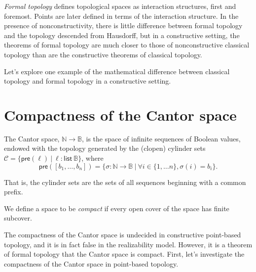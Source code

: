\documentclass{article}           %
\newcommand{\suchthat}{\ |\ }
\newcommand{\nat}{\mathbb{N}}
\newcommand{\bool}{\mathbb{B}}
\newcommand{\List}[1]{\mathsf{list}\ {#1}}
\begin{document}
\emph{Formal topology} defines topological spaces as interaction structures, first and foremost. Points are later defined in terms of the interaction structure. In the presence of nonconstructivity, there is little difference between formal topology and the topology descended from Hausdorff, but in a constructive setting, the theorems of formal topology are much closer to those of nonconstructive classical topology than are the constructive theorems of classical topology.

Let's explore one example of the mathematical difference between classical topology and formal topology in a constructive setting.

\section{Compactness of the Cantor space}

The Cantor space, $\nat \to \bool$, is the space of infinite sequences of Boolean values, endowed with the topology generated by the (clopen) cylinder sets $\mathcal{C} = \{ \mathsf{pre}(\ell) \suchthat \ell : \List{\bool} \}$, where
\[
\mathsf{pre}([b_1, \ldots, b_n]) = \{ \sigma : \nat \to \bool 
  \suchthat \forall i \in \{1, \ldots n \}, \sigma(i) = b_i \}.
\]

That is, the cylinder sets are the sets of all sequences beginning with a common prefix.

We define a space to be \emph{compact} if every open cover of the space has finite subcover.

The compactness of the Cantor space is undecided in constructive point-based topology, and it is in fact false in the realizability model. However, it is a theorem of formal topology that the Cantor space is compact. First, let's investigate the compactness of the Cantor space in point-based topology.
\end{document}
